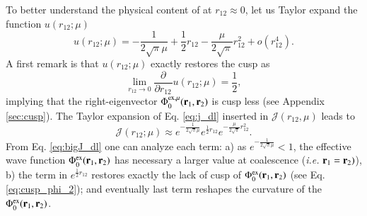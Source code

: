 \documentclass[aip,jcp,reprint,noshowkeys,superscriptaddress]{revtex4-1}
\newcommand{\deriv}[3]{\frac{\partial^{#3} #1}{\partial {#2}^{#3}}}
\newcommand{\br}[0]{{\bf {r}}}
\newcommand{\phiex}[0]{\Phi^{\text{ex}}_0}
\newcommand{\phimu}[0]{\Phi^{\text{ex},\mu}_0}
\begin{document}
To better understand the physical content of at $r_{12}\approx 0$,  
let us Taylor expand the function $u(r_{12};\mu)$ 
\begin{equation}
 \label{eq:j_dl}
 u(r_{12};\mu) = -\frac{1}{2\sqrt{\pi}\mu} + \frac{1}{2}r_{12} - \frac{\mu}{2\sqrt{\pi}} r_{12}^2 + o(r_{12}^4).
\end{equation}
A first remark is that $u(r_{12};\mu)$ exactly restores the cusp as
\begin{equation}
 \label{eq:cusp_phi_0}
 \lim_{r_{12}\rightarrow 0} \deriv{}{r_{12}}{}u(r_{12};\mu) = \frac{1}{2},
\end{equation}
implying that the right-eigenvector $\phimu(\br{}_{1},\br{}_{2})$ is cusp less (see Appendix \ref{sec:cusp}). 
The Taylor expansion of Eq. \eqref{eq:j_dl} inserted in $\mathcal{J}(r_{12},\mu)$ leads to 
\begin{equation}
 \label{eq:bigJ_dl}
 \mathcal{J}(r_{12};\mu) \approx e^{-\frac{1}{2\sqrt{\pi}\mu}} e^{ \frac{1}{2}r_{12}} e^{- \frac{\mu}{2\sqrt{\pi}} r_{12}^2}. 
\end{equation}
From Eq. \eqref{eq:bigJ_dl} one can analyze each term: a) as $e^{-\frac{1}{2\sqrt{\pi}\mu}}<1$, the effective wave function  $\phiex(\br{}_1,\br{}_2)$ has necessary a larger value at coalescence (\textit{i.e.} $\br{}_1=\br{}_2)$), 
b) the term in $e^{ \frac{1}{2}r_{12}} $ restores exactly the lack of cusp of $\phiex(\br{}_1,\br{}_2)$ (see Eq. \eqref{eq:cusp_phi_2}); and eventually last term reshapes the curvature of the $\phiex(\br{}_1,\br{}_2)$. 
\end{document}
